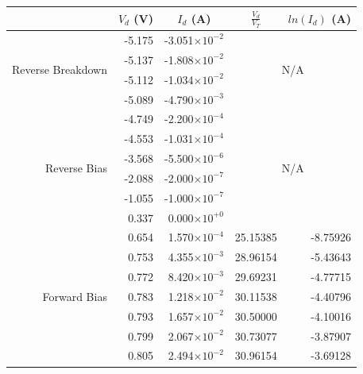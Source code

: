 \documentclass{article}
\begin{document}
\begin{table}[H]
  \centering
    \begin{tabular}{rrrrr}
    \toprule
    &\multicolumn{1}{c}{$V_d$ (V)} & \multicolumn{1}{c}{$I_d$ (A)} & \multicolumn{1}{c}{$\frac{V_d}{V_T}$} & \multicolumn{1}{c}{$ln(I_d)$ (A)} \\
    \midrule
    \multirow{4}[0]{*}{Reverse Breakdown} & -5.175 & -3.051$\times10^{-2}$ & \multicolumn{2}{c}{\multirow{4}[0]{*}{N/A}} \\
          & -5.137 & -1.808$\times10^{-2}$ & \multicolumn{2}{c}{} \\
          & -5.112 & -1.034$\times10^{-2}$ & \multicolumn{2}{c}{} \\
          & -5.089 & -4.790$\times10^{-3}$ & \multicolumn{2}{c}{} \\
          \midrule
    \multirow{6}[0]{*}{Reverse Bias} & -4.749 & -2.200$\times10^{-4}$ & \multicolumn{2}{c}{\multirow{6}[0]{*}{N/A}} \\
          & -4.553 & -1.031$\times10^{-4}$ & \multicolumn{2}{c}{} \\
          & -3.568 & -5.500$\times10^{-6}$ & \multicolumn{2}{c}{} \\
          & -2.088 & -2.000$\times10^{-7}$ & \multicolumn{2}{c}{} \\
          & -1.055 & -1.000$\times10^{-7}$ & \multicolumn{2}{c}{} \\
          & 0.337  &  0.000$\times10^{+0}$ & \multicolumn{2}{c}{} \\
    \midrule
    \multirow{7}[0]{*}{Forward Bias} & 0.654 & 1.570$\times10^{-4}$ & 25.15385 & -8.75926 \\
          & 0.753 & 4.355$\times10^{-3}$ & 28.96154 & -5.43643 \\
          & 0.772 & 8.420$\times10^{-3}$ & 29.69231 & -4.77715 \\
          & 0.783 & 1.218$\times10^{-2}$ & 30.11538 & -4.40796 \\
          & 0.793 & 1.657$\times10^{-2}$ & 30.50000 & -4.10016 \\
          & 0.799 & 2.067$\times10^{-2}$ & 30.73077 & -3.87907 \\
          & 0.805 & 2.494$\times10^{-2}$ & 30.96154 & -3.69128 \\
    \bottomrule
  \end{tabular}
\end{table}
\end{document}
